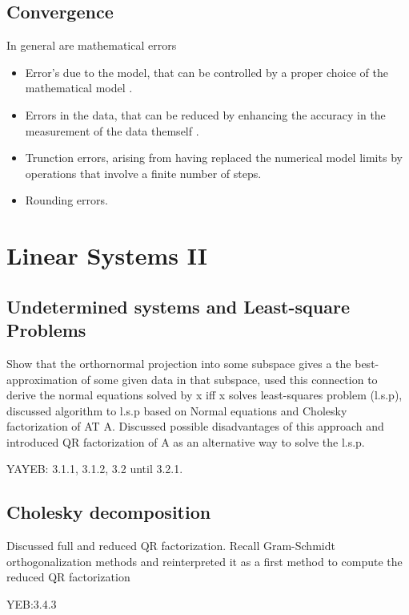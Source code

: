\documentclass{article}
\theoremstyle{remark}
\begin{document}
\subsection{Convergence}%
\label{sub:convergence}

In general are mathematical errors 
\begin{itemize}
  \item Error's due to the model, that can be controlled by a proper choice of the mathematical model . 
  \item Errors in the data, that can be reduced by enhancing the accuracy in the measurement of the data themself .
  \item Trunction errors, arising from having replaced the numerical model limits by operations that involve a finite number of steps.
  \item Rounding errors.
\end{itemize}

\newpage
\section{Linear Systems II}%
\label{sec:linear_systems_ii}

\subsection{Undetermined systems and Least-square Problems}%
\label{sub:undetermined_systems_and_least_square_problems}
\begin{tcolorbox}
  Show that the orthornormal projection into some subspace gives a the best-approximation of some given data in that subspace, used this connection to derive the normal equations solved by x iff x solves least-squares problem (l.s.p), discussed algorithm to l.s.p based on Normal equations and Cholesky factorization of AT A. Discussed possible disadvantages of this approach and introduced QR factorization of A as an alternative way to solve the l.s.p.	
  \par
  YAYEB: 3.1.1, 3.1.2, 3.2 until 3.2.1.

\end{tcolorbox}


\subsection{Cholesky decomposition}%
\label{sub:chelesky_decomposition}
\begin{tcolorbox}
  Discussed full and reduced QR factorization. Recall Gram-Schmidt orthogonalization methods and reinterpreted it as a first method to compute the reduced QR factorization	
  \par
  YEB:3.4.3
\end{tcolorbox}
\end{document}
